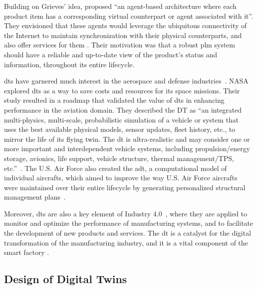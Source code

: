 Building on Grieves' idea, \textcite{framlingProductAgentsHandling2003} proposed ``an agent-based architecture where each product item has a corresponding virtual counterpart or agent associated with it''. They envisioned that these agents would leverage the ubiquitous connectivity of the Internet to maintain synchronization with their physical counterparts, and also offer services for them \parencite{framlingProductAgentsHandling2003}. Their motivation was that a robust \acrshort{plm} system should have a reliable and up-to-date view of the product's status and information, throughout its entire lifecycle.

\acrshort{dt}s have garnered much interest in the aerospace and defense industries~\parencite{negriReviewRolesDigital2017}. NASA explored \acrshort{dt}s as a way to save costs and resources for its space missions. Their study resulted in a roadmap that validated the value of \acrshort{dt}s in enhancing performance in the aviation domain. They described the DT as ``an integrated multi-physics, multi-scale, probabilistic simulation of a vehicle or system that uses the best available physical models, sensor updates, fleet history, etc., to mirror the life of its flying twin. The \acrshort{dt} is ultra-realistic and may consider one or more important and interdependent vehicle systems, including propulsion/energy storage, avionics, life support, vehicle structure, thermal management/TPS, etc.''~\parencite{shaftoModelingSimulationInformation2010}. The U.S. Air Force also created the \acrfull{adt}, a computational model of individual aircrafts, which aimed to improve the way U.S. Air Force aircrafts were maintained over their entire lifecycle by generating personalized structural management plans~\parencite{tuegelAirframeDigitalTwin2012,gockelChallengesStructuralLife2012}.

Moreover, \acrshort{dt}s are also a key element of Industry 4.0~\parencite{brettelHowVirtualizationDecentralization2014,hermannDesignPrinciplesIndustrie2016,vachalekDigitalTwinIndustrial2017,negriReviewRolesDigital2017}, where they are applied to monitor and optimize the performance of manufacturing systems, and to facilitate the development of new products and services. The \acrshort{dt} is a catalyst for the digital transformation of the manufacturing industry, and it is a vital component of the smart factory \parencite{mabkhotRequirementsSmartFactory2018}.

\subsection{Design of Digital Twins}\label{sec:dt_design}

